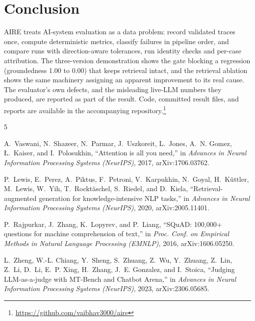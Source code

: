 \documentclass[conference]{IEEEtran}
\begin{document}
\section{Conclusion}
AIRE treats AI-system evaluation as a data problem: record validated traces
once, compute deterministic metrics, classify failures in pipeline order,
and compare runs with direction-aware tolerances, run identity checks and
per-case attribution. The three-version demonstration shows the gate
blocking a regression (groundedness 1.00 to 0.00) that keeps retrieval
intact, and the retrieval ablation shows the same machinery assigning an
apparent improvement to its real cause. The evaluator's own defects, and
the misleading live-LLM numbers they produced, are reported as part of the
result. Code, committed result files, and reports are available in the
accompanying repository.\footnote{\url{https://github.com/vaibhav3000/aire}}

\balance
\begin{thebibliography}{5}

A.~Vaswani, N.~Shazeer, N.~Parmar, J.~Uszkoreit, L.~Jones, A.~N. Gomez,
{\L}.~Kaiser, and I.~Polosukhin, ``Attention is all you need,'' in
\emph{Advances in Neural Information Processing Systems (NeurIPS)}, 2017,
arXiv:1706.03762.

P.~Lewis, E.~Perez, A.~Piktus, F.~Petroni, V.~Karpukhin, N.~Goyal,
H.~K{\"u}ttler, M.~Lewis, W.~Yih, T.~Rockt{\"a}schel, S.~Riedel, and
D.~Kiela, ``Retrieval-augmented generation for knowledge-intensive NLP
tasks,'' in \emph{Advances in Neural Information Processing Systems
(NeurIPS)}, 2020, arXiv:2005.11401.

P.~Rajpurkar, J.~Zhang, K.~Lopyrev, and P.~Liang, ``SQuAD: 100{,}000+
questions for machine comprehension of text,'' in \emph{Proc. Conf. on
Empirical Methods in Natural Language Processing (EMNLP)}, 2016,
arXiv:1606.05250.

L.~Zheng, W.-L. Chiang, Y.~Sheng, S.~Zhuang, Z.~Wu, Y.~Zhuang, Z.~Lin,
Z.~Li, D.~Li, E.~P. Xing, H.~Zhang, J.~E. Gonzalez, and I.~Stoica,
``Judging LLM-as-a-judge with MT-Bench and Chatbot Arena,'' in
\emph{Advances in Neural Information Processing Systems (NeurIPS)}, 2023,
arXiv:2306.05685.

\end{thebibliography}
\end{document}
